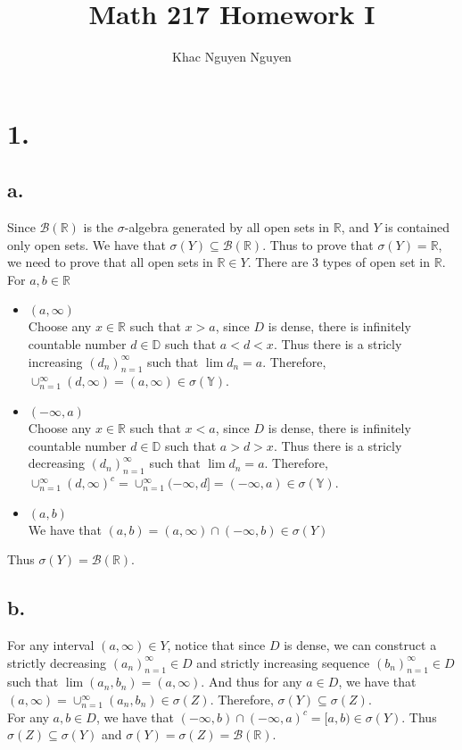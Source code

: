 \documentclass[11pt]{article}
\title{\textbf{Math 217 Homework I}}
\author{Khac Nguyen Nguyen}
\date{}
\theoremstyle{mystyle}
\theoremstyle{definition}
\begin{document}
\section*{1.}
\subsection*{a.}
Since $\mathcal{B}(\mathbb{R})$ is the $\sigma$-algebra generated by all open sets in $\mathbb{R}$, and $Y$ is contained only open sets. We have that $\sigma(Y) \subseteq \mathcal{B}(\mathbb{R})$. Thus to prove that $\sigma(Y) = \mathbb{R}$, we need to prove that all open sets in $\mathbb{R} \in Y$. There are 3 types of open set in $\mathbb{R}$. For $a, b \in \mathbb{R}$ 
\begin{itemize}
  \item $(a,\infty)$ \\
    Choose any $x \in \mathbb{R}$ such that $x>a$, since $D$ is dense, there is infinitely countable number $d \in \mathbb{D}$ such that $a<d<x$. Thus there is a stricly increasing $(d_n)_{n=1}^\infty$ such that $\lim d_n = a$. Therefore, $\cup_{n=1}^\infty (d, \infty) = (a, \infty) \in \sigma(\mathbb{Y})$.    
  \item $(-\infty, a)$ \\
    Choose any $x \in \mathbb{R}$ such that $x<a$, since $D$ is dense, there is infinitely countable number $d \in \mathbb{D}$ such that $a>d>x$. Thus there is a stricly decreasing $(d_n)_{n=1}^\infty$ such that $\lim d_n = a$. Therefore, $\cup_{n=1}^\infty (d, \infty)^c = \cup_{n=1}^\infty (-\infty, d] = (-\infty, a) \in \sigma(\mathbb{Y})$.    
  \item $(a, b)$ \\
    We have that $(a,b) = (a, \infty) \cap (-\infty, b) \in \sigma(Y)$
\end{itemize}
Thus $\sigma(Y) = \mathcal{B}(\mathbb{R})$. 
\subsection*{b.}
For any interval $(a, \infty) \in Y$,  notice that since $D$ is dense, we can construct a strictly decreasing $(a_n)_{n=1}^\infty \in D$ and strictly increasing sequence $(b_n)_{n=1}^\infty \in D$ such that $\lim (a_n, b_n) = (a, \infty)$. And thus for any $a \in D$, we have that $(a, \infty) = \cup_{n=1}^\infty (a_n, b_n) \in \sigma(Z)$. Therefore, $\sigma(Y) \subseteq \sigma(Z)$. \\
For any $a, b \in D$, we have that $(-\infty, b) \cap (-\infty, a)^c = [a, b) \in \sigma(Y)$. Thus $\sigma(Z) \subseteq \sigma(Y)$ and $\sigma(Y) = \sigma(Z) = \mathcal{B}(\mathbb{R})$.  
\end{document}

